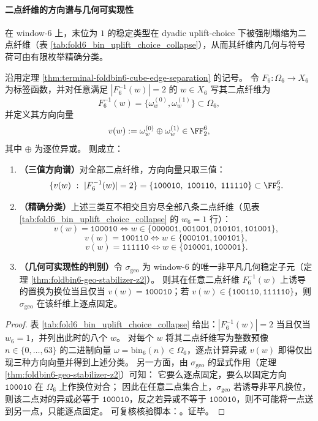 \paragraph{二点纤维的方向谱与几何可实现性}
在 window-\(6\) 上，末位为 \(1\) 的稳定类型在 dyadic uplift-choice 下被强制塌缩为二点纤维（表 \ref{tab:fold6_bin_uplift_choice_collapse}），从而其纤维内几何与符号荷可由有限枚举精确分类。

\begin{theorem}\label{thm:terminal-foldbin6-two-point-fiber-direction-spectrum}
沿用定理 \ref{thm:terminal-foldbin6-cube-edge-separation} 的记号。
令 \(F_6:\Omega_6\to X_6\) 为标签函数，并对任意满足 \(|F_6^{-1}(w)|=2\) 的 \(w\in X_6\) 写其二点纤维为
\[
F_6^{-1}(w)=\{\omega_w^{(0)},\omega_w^{(1)}\}\subset\Omega_6,
\]
并定义其方向向量
\[
v(w):=\omega_w^{(0)}\oplus\omega_w^{(1)}\in\FF_2^6,
\]
其中 \(\oplus\) 为逐位异或。
则成立：
\begin{enumerate}
\item \textbf{（三值方向谱）}对全部二点纤维，方向向量只取三值：
\[
\{v(w)\ :\ |F_6^{-1}(w)|=2\}=\{\texttt{100010},\ \texttt{100110},\ \texttt{111110}\}\subset\FF_2^6.
\]
\item \textbf{（精确分类）}上述三类互不相交且穷尽全部八条二点纤维（见表 \ref{tab:fold6_bin_uplift_choice_collapse} 的 \(w_6=1\) 行）：
\[
v(w)=\texttt{100010}\iff w\in\{\texttt{000001},\texttt{001001},\texttt{010101},\texttt{101001}\},
\]
\[
v(w)=\texttt{100110}\iff w\in\{\texttt{000101},\texttt{100101}\},
\]
\[
v(w)=\texttt{111110}\iff w\in\{\texttt{010001},\texttt{100001}\}.
\]
\item \textbf{（几何可实现性的判别）}令 \(\sigma_{\mathrm{geo}}\) 为 window-\(6\) 的唯一非平凡几何稳定子元（定理 \ref{thm:foldbin6-geo-stabilizer-z2}）。
则其在任意二点纤维 \(F_6^{-1}(w)\) 上诱导的置换为换位当且仅当 \(v(w)=\texttt{100010}\)；若 \(v(w)\in\{\texttt{100110},\texttt{111110}\}\)，则 \(\sigma_{\mathrm{geo}}\) 在该纤维上逐点固定。
\end{enumerate}
\end{theorem}

\begin{proof}
表 \ref{tab:fold6_bin_uplift_choice_collapse} 给出：\(|F_6^{-1}(w)|=2\) 当且仅当 \(w_6=1\)，并列出此时的八个 \(w\)。
对每个 \(w\) 将其二点纤维写为整数预像 \(n\in\{0,\dots,63\}\) 的二进制向量 \(\omega=\mathrm{bin}_6(n)\in\Omega_6\)，逐点计算异或 \(v(w)\) 即得仅出现三种方向向量并得到上述分类。
另一方面，由 \(\sigma_{\mathrm{geo}}\) 的显式作用（定理 \ref{thm:foldbin6-geo-stabilizer-z2}）可知：
它要么逐点固定，要么以固定方向 \(\texttt{100010}\) 在 \(\Omega_6\) 上作换位对合；
因此在任意二点集合上，\(\sigma_{\mathrm{geo}}\) 若诱导非平凡换位，则该二点对的异或必等于 \(\texttt{100010}\)，反之若异或不等于 \(\texttt{100010}\)，则不可能将一点送到另一点，只能逐点固定。
可复核核验脚本：\texttt{}。证毕。
\end{proof}

